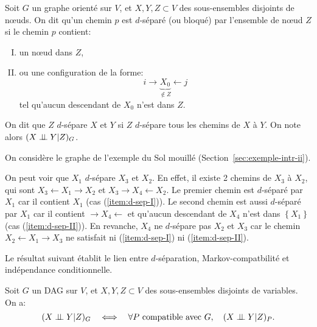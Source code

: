 \begin{definition}[$d$-séparation]
  \label{def:d-separation}
Soit $G$ un graphe orienté sur $V$, et $X,Y,Z\subset V$ des sous-ensembles
disjoints de n\oe uds.
On dit qu'un chemin $p$ est $d$-séparé (ou bloqué) par l'ensemble de
n\oe ud $Z$ si le chemin $p$ contient:
\begin{enumerate}[(I)]
\item\label{item:d-sep-I} un n\oe ud dans $Z$,
\item\label{item:d-sep-II} ou une configuration de la forme:
   \[ i\to \underbrace{X_0}_{\not \in Z}\leftarrow j \]
   tel qu'aucun descendant de $X_0$ n'est dans $Z$.
\end{enumerate}
On dit que $Z$ $d$-sépare $X$ et $Y$ si $Z$ $d$-sépare tous les
chemins de $X$ à $Y$. On note alors $(X\perp\!\!\!\perp Y|Z)_G$.
\end{definition}
\begin{example}
On considère le graphe de l'exemple du Sol mouillé (Section~\ref{sec:exemple-intr-ii}).
\begin{center}
\end{center}
On peut voir que $X_1$ $d$-sépare $X_3$ et $X_2$. En effet, il existe
2 chemins de $X_3$ à $X_2$, qui sont $X_3\leftarrow X_1\to X_2$ et $X_3\to X_4\leftarrow X_2$.
Le premier chemin est $d$-séparé par $X_1$ car il contient $X_1$ (cas
(\ref{item:d-sep-I})). Le second chemin est aussi $d$-séparé par $X_1$
car il contient $\to X_4\leftarrow$ et qu'aucun descendant de $X_4$ n'est dans $\left\{ X_1 \right\}$ (cas (\ref{item:d-sep-II})).
En revanche, $X_4$ ne $d$-sépare pas $X_2$ et $X_3$ car le chemin
$X_2\leftarrow X_1\to X_3$ ne satisfait ni (\ref{item:d-sep-I}) ni (\ref{item:d-sep-II}).
\end{example}
Le résultat suivant établit le lien entre $d$-séparation,
Markov-compatbilité et indépendance conditionnelle.
\begin{theorem}
\label{thm:d-separation-markov-compatibilite}
Soit $G$ un DAG sur $V$, et $X,Y,Z\subset V$ des sous-ensembles disjoints de variables.
On a:
   \[ (X\perp\!\!\!\perp Y|Z)_G\quad \Longleftrightarrow \quad \forall P \text{ compatible avec }G,\quad  (X\perp\!\!\!\perp Y|Z)_P. \]
\end{theorem}

